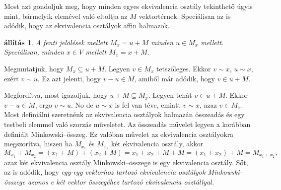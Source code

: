 \documentclass[9pt, a4paper, showtrims]{memoir}
\makeatletter
\renewenvironment{proof}[1][\proofname]
    {\par\pushQED{\qed}%
    \normalfont \topsep6\p@\@plus6\p@\relax
    \trivlist
    \item[\hskip\labelsep
        \itshape
    #1\@addpunct{:}]\ignorespaces}
    {\popQED\endtrivlist\@endpefalse}
\theoremstyle{plain}
\newtheorem{proposition}{állítás}[chapter]
\theoremstyle{remark}
\theoremstyle{definition}
\makeatother
\begin{document}
    Most azt gondoljuk meg, hogy minden egyes ekvivalencia osztály tekinthető úgyis mint,
    bármelyik elemével való eltoltja az $M$ vektortérnek.
    Speciálisan az is adódik, 
    hogy az ekvivalencia osztályok affin halmazok.
    \begin{proposition}
        A fenti jelölések mellett $M_x=u+M$ minden $u\in M_x$ mellett.
        Speciálisan, minden $x\in V$ mellett $M_x=x+M$.
    \end{proposition}
    \begin{proof}
        Megmutatjuk, hogy $M_x\subseteq u+M$.
        Legyen $v\in M_x$ tetszőleges.
        Ekkor $v\sim x$, $u\sim x$, ezért $v\sim u$.
        Ez azt jelenti, hogy $v-u\in M$, amiből már adódik, 
        hogy $v\in u+M$.

        Megfordítva, most igazoljuk, hogy $u+M\subseteq M_x$.
        Legyen tehát $v\in u+M$.
        Ekkor $v-u\in M$, ergo $v\sim u$.
        No de $u\sim x$ is fel van téve, 
        emiatt $v\sim x$, azaz $v\in M_x$.
    \end{proof}
    Most definiálni szeretnénk az ekvivalencia osztályok halmazán összeadás és egy testbeli elemmel való
    szorzás műveletet.
    Az összeadás művelet legyen a korábban definiált Minkowski--összeg.
    Ez valóban művelet az ekvivalencia osztályokra megszorítva, 
    hiszen ha $M_{x_1}$ és $M_{x_2}$ két ekvivalencia osztály,
    akkor
    \[
        M_{x_1}+M_{x_2}=\left( x_1+M \right)+\left( x_2+M \right)
        =
        x_1+x_2+M+M=
        \left( x_1+x_2 \right)+M
        =
        M_{x_1+x_2},\tag{\dag}
    \]
    azaz két ekvivalencia osztály Minkowski--összege is egy ekvivalencia osztály.
    Sőt, az is adódik, hogy 
    \emph{
        egy-egy vektorhoz tartozó ekvivalencia osztályok Minkowski--összege
        azonos e két vektor összegéhez tartozó ekvivalencia osztállyal.}
\end{document}
